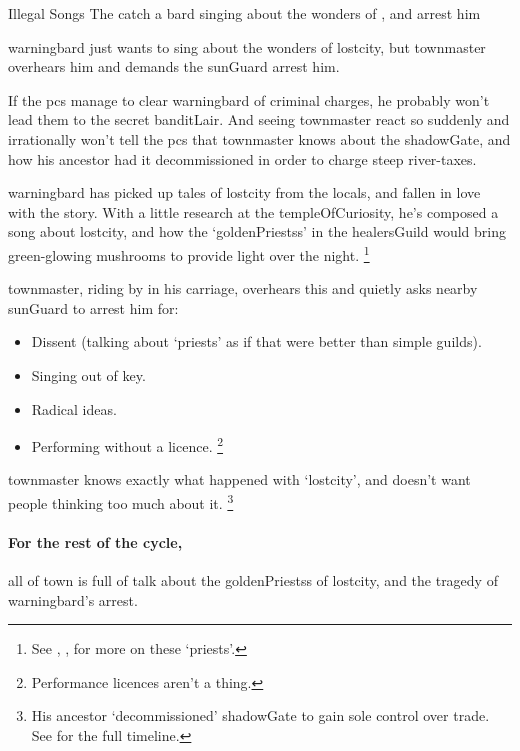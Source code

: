 \banditking

{Illegal Songs}%
{The  catch a bard singing about the wonders of , and arrest him}%

\Gls{warningbard} just wants to sing about the wonders of \gls{lostcity}, but \gls{townmaster} overhears him and demands the \gls{sunGuard} arrest him.

If the \glspl{pc} manage to clear \gls{warningbard} of criminal charges, he probably won't lead them to the secret \gls{banditLair}.
And seeing \gls{townmaster} react so suddenly and irrationally won't tell the \glspl{pc} that \gls{townmaster} knows about the \gls{shadowGate}, and how his ancestor had it decommissioned in order to charge steep river-taxes.

\begin{exampletext}
  \Gls{warningbard} has picked up tales of \gls{lostcity} from the locals, and fallen in love with the story.
  With a little research at the \gls{templeOfCuriosity}, he's composed a song about \gls{lostcity}, and how the `\glspl{goldenPriests}' in the \gls{healersGuild} would bring green-glowing mushrooms to provide light over the night.%
  \footnote{See , , for more on these `priests'.}
\end{exampletext}

\Gls{townmaster}, riding by in his carriage, overhears this and quietly asks nearby \gls{sunGuard} to arrest him for:

\begin{itemize}
  \item
  Dissent (talking about `priests' as if that were better than simple guilds).
  \item
  Singing out of key.
  \item
  Radical ideas.
  \item
  Performing without a licence.%
  \footnote{Performance licences aren't a thing.}
\end{itemize}

\Gls{townmaster} knows exactly what happened with `\gls{lostcity}', and doesn't want people thinking too much about it.%
\footnote{His ancestor `decommissioned' \gls{shadowGate} to gain sole control over trade.
See  for the full timeline.}

\paragraph{For the rest of the \gls{cycle},}
all of \gls{town} is full of talk about the \glspl{goldenPriests} of \gls{lostcity}, and the tragedy of \gls{warningbard}'s arrest.

